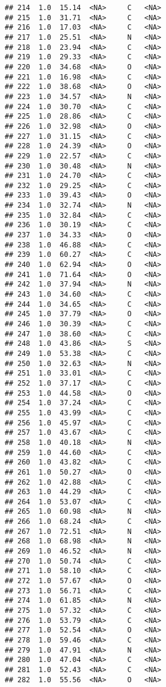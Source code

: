 \documentclass[
]{article}
\begin{document}
\begin{verbatim}
## 214  1.0  15.14  <NA>     C   <NA>
## 215  1.0  31.71  <NA>     C   <NA>
## 216  1.0  17.03  <NA>     C   <NA>
## 217  1.0  25.51  <NA>     N   <NA>
## 218  1.0  23.94  <NA>     C   <NA>
## 219  1.0  29.33  <NA>     C   <NA>
## 220  1.0  34.68  <NA>     O   <NA>
## 221  1.0  16.98  <NA>     C   <NA>
## 222  1.0  38.68  <NA>     O   <NA>
## 223  1.0  34.57  <NA>     N   <NA>
## 224  1.0  30.70  <NA>     C   <NA>
## 225  1.0  28.86  <NA>     C   <NA>
## 226  1.0  32.98  <NA>     O   <NA>
## 227  1.0  31.15  <NA>     C   <NA>
## 228  1.0  24.39  <NA>     O   <NA>
## 229  1.0  22.57  <NA>     C   <NA>
## 230  1.0  30.48  <NA>     N   <NA>
## 231  1.0  24.70  <NA>     C   <NA>
## 232  1.0  29.25  <NA>     C   <NA>
## 233  1.0  39.43  <NA>     O   <NA>
## 234  1.0  32.74  <NA>     N   <NA>
## 235  1.0  32.84  <NA>     C   <NA>
## 236  1.0  30.19  <NA>     C   <NA>
## 237  1.0  34.33  <NA>     O   <NA>
## 238  1.0  46.88  <NA>     C   <NA>
## 239  1.0  60.27  <NA>     C   <NA>
## 240  1.0  62.94  <NA>     O   <NA>
## 241  1.0  71.64  <NA>     O   <NA>
## 242  1.0  37.94  <NA>     N   <NA>
## 243  1.0  34.60  <NA>     C   <NA>
## 244  1.0  34.65  <NA>     C   <NA>
## 245  1.0  37.79  <NA>     O   <NA>
## 246  1.0  30.39  <NA>     C   <NA>
## 247  1.0  38.60  <NA>     C   <NA>
## 248  1.0  43.86  <NA>     S   <NA>
## 249  1.0  53.38  <NA>     C   <NA>
## 250  1.0  32.63  <NA>     N   <NA>
## 251  1.0  33.01  <NA>     C   <NA>
## 252  1.0  37.17  <NA>     C   <NA>
## 253  1.0  44.58  <NA>     O   <NA>
## 254  1.0  37.24  <NA>     C   <NA>
## 255  1.0  43.99  <NA>     C   <NA>
## 256  1.0  45.97  <NA>     C   <NA>
## 257  1.0  43.67  <NA>     C   <NA>
## 258  1.0  40.18  <NA>     N   <NA>
## 259  1.0  44.60  <NA>     C   <NA>
## 260  1.0  43.82  <NA>     C   <NA>
## 261  1.0  50.27  <NA>     O   <NA>
## 262  1.0  42.88  <NA>     C   <NA>
## 263  1.0  44.29  <NA>     C   <NA>
## 264  1.0  53.07  <NA>     C   <NA>
## 265  1.0  60.98  <NA>     N   <NA>
## 266  1.0  68.24  <NA>     C   <NA>
## 267  1.0  72.51  <NA>     N   <NA>
## 268  1.0  68.98  <NA>     N   <NA>
## 269  1.0  46.52  <NA>     N   <NA>
## 270  1.0  50.74  <NA>     C   <NA>
## 271  1.0  58.10  <NA>     C   <NA>
## 272  1.0  57.67  <NA>     O   <NA>
## 273  1.0  56.71  <NA>     C   <NA>
## 274  1.0  61.85  <NA>     N   <NA>
## 275  1.0  57.32  <NA>     C   <NA>
## 276  1.0  53.79  <NA>     C   <NA>
## 277  1.0  52.54  <NA>     O   <NA>
## 278  1.0  59.46  <NA>     C   <NA>
## 279  1.0  47.91  <NA>     N   <NA>
## 280  1.0  47.04  <NA>     C   <NA>
## 281  1.0  52.43  <NA>     C   <NA>
## 282  1.0  55.56  <NA>     O   <NA>

\end{verbatim}
\end{document}
